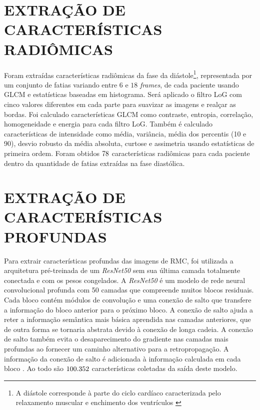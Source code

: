 \section{EXTRAÇÃO DE CARACTERÍSTICAS RADIÔMICAS}
\label{subsec:cap4_caracteristicas_radiomicas}

Foram extraídas características radiômicas da fase da diástole\footnote{A diástole corresponde à parte do ciclo cardíaco caracterizada pelo relaxamento muscular e enchimento dos ventrículos \cite{brielerCardiomyopathyOverview2017}}, representada por um conjunto de fatias variando entre $6$ e $18$ \textit{frames}, de cada paciente usando \gls{GLCM} e estatísticas baseadas em histograma. Será aplicado o filtro \gls{LoG} com cinco valores diferentes em cada parte para suavizar as imagens e realçar as bordas. Foi calculado características \gls{GLCM} como contraste, entropia, correlação, homogeneidade e energia para cada filtro \gls{LoG}. Também é calculado características de intensidade como média, variância, média dos percentis (10 e 90), desvio robusto da média absoluta, curtose e assimetria usando estatísticas de primeira ordem. Foram obtidos $78$ características radiômicas para cada paciente dentro da quantidade de fatias extraídas na fase diastólica.

\section{EXTRAÇÃO DE CARACTERÍSTICAS PROFUNDAS}
\label{subsec:cap4_caracteristicas_profundas}
 
Para extrair características profundas das imagens de \gls{RMC}, foi utilizada a arquitetura pré-treinada de um \textit{ResNet50} sem sua última camada totalmente conectada e com os pesos congelados. A \textit{ResNet50} é um modelo de rede neural convolucional profunda com 50 camadas que compreende muitos blocos residuais. Cada bloco contém módulos de convolução e uma conexão de salto que transfere a informação do bloco anterior para o próximo bloco. A conexão de salto ajuda a reter a informação semântica mais básica aprendida nas camadas anteriores, que de outra forma se tornaria abstrata devido à conexão de longa cadeia. A conexão de salto também evita o desaparecimento do gradiente nas camadas mais profundas ao fornecer um caminho alternativo para a retropropagação. A informação da conexão de salto é adicionada à informação calculada em cada bloco \cite{aiSelfAttentionBasedFusion2023}. Ao todo são $100.352$ características coletadas da saída deste modelo.


